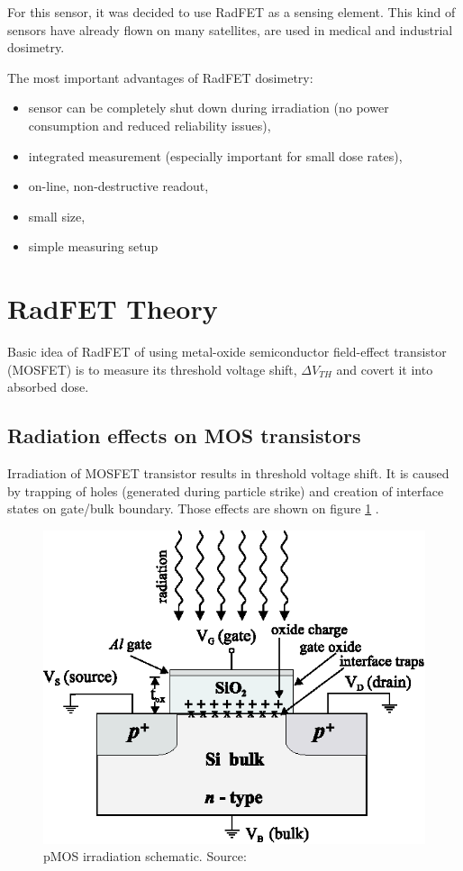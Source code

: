     For this sensor, it was decided to use RadFET as a sensing element. This kind of sensors have already flown on many satellites, are used in medical and industrial dosimetry.
	
	The most important advantages of RadFET dosimetry:
    \begin{itemize}
        \item sensor can be completely shut down during irradiation (no power consumption and reduced reliability issues),
        \item integrated measurement (especially important for small dose rates),
        \item on-line, non-destructive readout,
        \item small size,
        \item simple measuring setup
    \end{itemize}

\section{RadFET Theory}
    Basic idea of RadFET of using metal-oxide semiconductor field-effect transistor (MOSFET) is to measure its threshold voltage shift, $\Delta V_{TH}$ and covert it into absorbed dose. 
    
    \subsection{Radiation effects on MOS transistors}
    \label{Radiation_effects_on_MOS_transistors}
        Irradiation of MOSFET transistor results in threshold voltage shift. It is caused by trapping of holes (generated during particle strike) and creation of interface states on gate/bulk boundary. Those effects are shown on figure \ref{MOS_irradiation} \cite{pMOS_dosimeters_radfets}.

        \begin{figure}[H]
            \centering
            \includegraphics[width=0.4\paperwidth]{img/03/MOS_irradiation_schematic.eps}
            \caption{pMOS irradiation schematic. Source: \cite{pMOS_dosimeters_radfets}}
            \label{MOS_irradiation}
        \end{figure}

